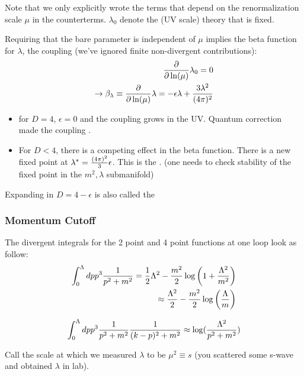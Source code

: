 \documentclass[11pt]{scrartcl}
\begin{document}
Note that we only explicitly wrote the terms that depend on the renormalization scale $\mu$ in the counterterms.  $\lambda_0$ denote the  (UV scale) theory that is fixed.

Requiring that the bare parameter is independent of $\mu$ implies the beta function for $\lambda$, the  coupling (we've ignored finite non-divergent contributions):
\begin{align}
	{\partial \over \partial \ln(\mu)} \lambda_0 = 0 \\
	\rightarrow  	\beta_\lambda \equiv {\partial \over \partial \ln(\mu)} \lambda = -\epsilon \lambda + {3 \lambda^2 \over (4 \pi)^2}
	\end{align}

\begin{itemize}
	\item for $D = 4$, $\epsilon = 0$ and the coupling grows in the UV.  Quantum correction made the coupling .
	\item For $D < 4$, there is a competing effect in the beta function. There is a new fixed point at 
	$\lambda^* = {(4 \pi)^2 \over 3} \epsilon$.  This is the .
	(one needs to check stability of the fixed point in the $m^2, \lambda$ submanifold)
	\end{itemize}

Expanding in $D = 4- \epsilon$ is also called the 




\subsubsection{Momentum Cutoff}
The divergent integrals for the 2 point and 4 point functions at one loop look as follow:
\begin{align}
	\int_0^\Lambda dp p^3 {1 \over p^2 + m^2} = \frac12 \Lambda^2 - {m^2 \over 2} \log \left( 1+{\Lambda^2 \over m^2}\right) \\
	\approx {\Lambda^2 \over 2} -{m^2 \over 2} \log \left( {\Lambda \over m}\right)
	\end{align}

\begin{align}
	\int_0^{\Lambda} dp p^3 {1 \over p^2 + m^2} {1 \over (k-p)^2 + m^2} \approx \log ({\Lambda^2 \over p^2 + m^2})
	\end{align}

Call the scale at which we measured $\lambda$ to be $\mu^2 \equiv s$ (you scattered some s-wave and obtained $\lambda$ in lab). 
\end{document}

